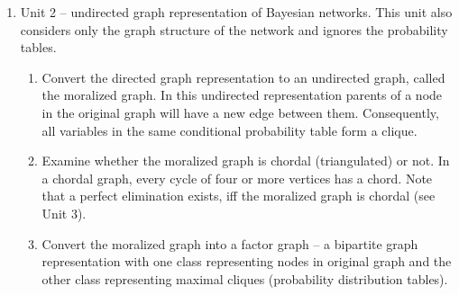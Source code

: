 \documentclass{article}
\newcommand{\comment}[2]{
	\todo[color=GreenYellow,inline]{
		\underline{\textbf{#1:}} #2
	}}
\begin{document}
\begin{enumerate}
        \vspace{0.5cm}
        \item Unit 2\label{unit2} -- 
        undirected graph representation of Bayesian networks.  This unit also considers only the graph structure of the network and ignores the probability tables.
        \begin{enumerate}
            \item 
             Convert the directed graph representation to an undirected graph, called the moralized graph. In this undirected representation parents of a node in the original graph will have a new edge between them. %
             Consequently, all variables in the same conditional probability table form a clique.
            \item %
            Examine whether the moralized graph is chordal (triangulated) or not. %
            In a chordal graph, every cycle of four or more vertices %
            has a chord. %
            Note that a perfect elimination exists, iff the moralized graph is chordal (see Unit 3).
            \item Convert the moralized graph into a factor graph -- a bipartite graph representation with one class representing nodes in original graph and the other class representing maximal cliques (probability distribution tables).
        \end{enumerate}
        
        
 

\end{enumerate}
\end{document}
